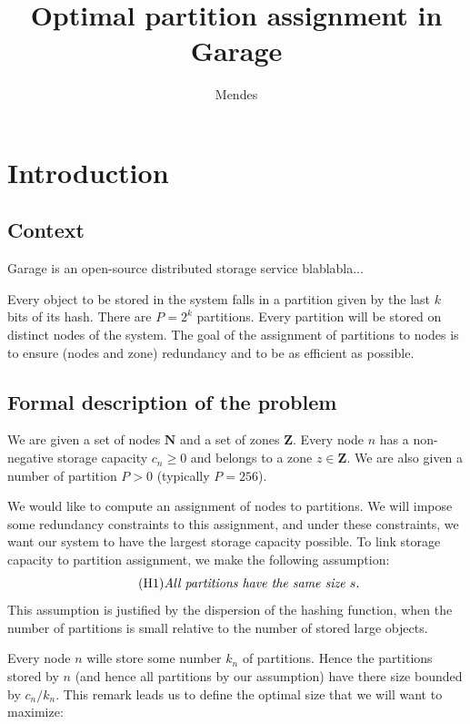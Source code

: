 \documentclass[]{article}
\title{Optimal partition assignment in Garage}
\author{Mendes}
\begin{document}
\maketitle

\section{Introduction}

\subsection{Context}

Garage is an open-source distributed storage service blablabla$\dots$

Every object to be stored in the system falls in a partition given by the last $k$ bits of its hash. There are $P=2^k$ partitions. Every partition will be stored on distinct nodes of the system. The goal of the assignment of partitions to nodes is to ensure (nodes and zone) redundancy and to be as efficient as possible.

\subsection{Formal description of the problem}

We are given a set of nodes $\mathbf{N}$ and a set of zones $\mathbf{Z}$. Every node $n$ has a non-negative storage capacity $c_n\ge 0$ and belongs to a zone $z\in \mathbf{Z}$. We are also given a number of partition $P>0$ (typically $P=256$).

We would like to compute an assignment of nodes to partitions. We will impose some redundancy constraints to this assignment, and under these constraints, we want our system to have the largest storage capacity possible. To link storage capacity to partition assignment, we make the following assumption:
\begin{equation}
	\tag{H1}
	\text{\emph{All partitions have the same size $s$.}}
\end{equation}
This assumption is justified by the dispersion of the hashing function, when the number of partitions is small relative to the number of stored large objects.

Every node $n$ wille store some number $k_n$ of partitions. Hence the partitions stored by $n$ (and hence all partitions by our assumption) have there size bounded by $c_n/k_n$. This remark leads us to define the optimal size that we will want to maximize:
\end{document}
